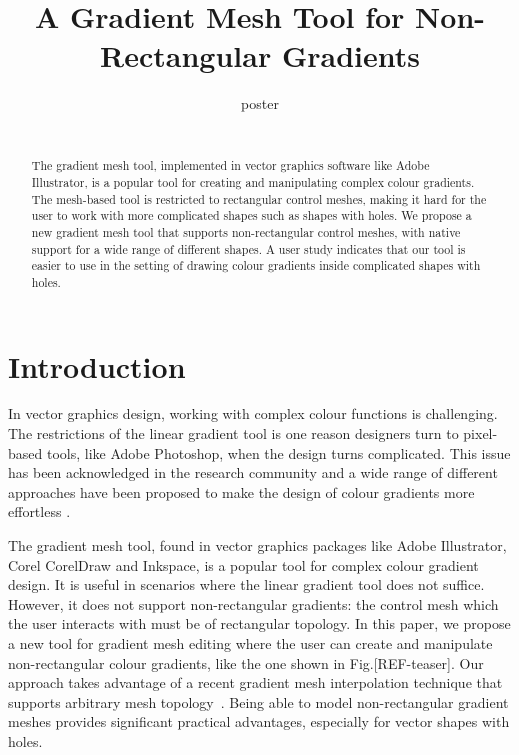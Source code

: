 \documentclass{egpubl}
\title[Non-rectangular gradient mesh tool]
{A Gradient Mesh Tool for Non-Rectangular Gradients}
\author[poster]
{\parbox{\textwidth}{\centering poster}
	\\
	{\parbox{\textwidth}{\centering } }
}
\begin{document}
	
	
	\maketitle
	
	\begin{abstract}
		The gradient mesh tool, implemented in vector graphics software like Adobe Illustrator, is a popular tool for creating and manipulating complex colour gradients. The mesh-based tool is restricted to rectangular control meshes, making it hard for the user to work with more complicated shapes such as shapes with holes. We propose a new gradient mesh tool that supports non-rectangular control meshes, with native support for a wide range of different shapes. A user study indicates that our tool is easier to use in the setting of drawing colour gradients inside complicated shapes with holes.
		
		\begin{classification} %
		\end{classification}
		
	\end{abstract}
	
	\section{Introduction}
	\label{sec:intro}
	
	In vector graphics design, working with complex colour functions is challenging. The restrictions of the linear gradient tool is one reason designers turn to pixel-based tools, like Adobe Photoshop, when the design turns complicated. This issue has been acknowledged in the research community and a wide range of different approaches have been proposed to make the design of colour gradients more effortless \cite{Orzan:2008,Lopez-Moreno:2013, Vergne:2012, Shao:2012}.
	
	The gradient mesh tool, found in vector graphics packages like Adobe Illustrator, Corel CorelDraw and Inkspace, is a popular tool for complex colour gradient design. It is useful in scenarios where the linear gradient tool does not suffice. However, it does not support non-rectangular gradients: the control mesh which the user interacts with must be of rectangular topology. In this paper, we propose a new tool for gradient mesh editing where the user can create and manipulate non-rectangular colour gradients, like the one shown in Fig.[REF-teaser]. Our approach takes advantage of a recent gradient mesh interpolation technique that supports arbitrary mesh topology~\cite{Lieng:2016}. Being able to model non-rectangular gradient meshes provides significant practical advantages, especially for vector shapes with holes.
	
\end{document}
